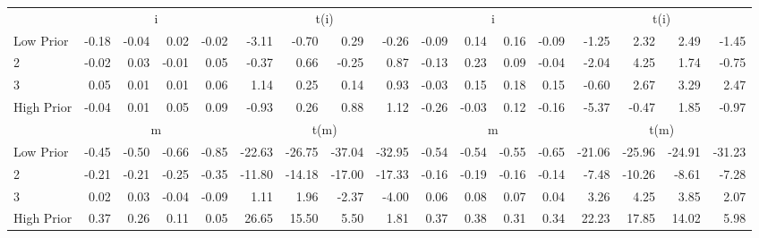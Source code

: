 \begin{table}[!ht]
\begin{tabular}{lrrrrrrrrrrrrrrrr}
  
     & \multicolumn{4}{c}{i} & \multicolumn{4}{c}{t(i)}  & \multicolumn{4}{c}{i} & \multicolumn{4}{c}{t(i)}   \\
     \cmidrule(r){2-5} \cmidrule(r){6-9}  \cmidrule(r){10-13} \cmidrule(r){14-17} 
    Low Prior  & -0.18  & -0.04  & 0.02  & -0.02  & -3.11  & -0.70  & 0.29  & -0.26  & -0.09  & 0.14  & 0.16  & -0.09  & -1.25  & 2.32  & 2.49  & -1.45   \\
    2  & -0.02  & 0.03  & -0.01  & 0.05  & -0.37  & 0.66  & -0.25  & 0.87  & -0.13  & 0.23  & 0.09  & -0.04  & -2.04  & 4.25  & 1.74  & -0.75   \\
    3  & 0.05  & 0.01  & 0.01  & 0.06  & 1.14  & 0.25  & 0.14  & 0.93  & -0.03  & 0.15  & 0.18  & 0.15  & -0.60  & 2.67  & 3.29  & 2.47   \\
    High Prior  & -0.04  & 0.01  & 0.05  & 0.09  & -0.93  & 0.26  & 0.88  & 1.12  & -0.26  & -0.03  & 0.12  & -0.16  & -5.37  & -0.47  & 1.85  & -0.97   \\
    
  
     & \multicolumn{4}{c}{m} & \multicolumn{4}{c}{t(m)}  & \multicolumn{4}{c}{m} & \multicolumn{4}{c}{t(m)}   \\
     \cmidrule(r){2-5} \cmidrule(r){6-9}  \cmidrule(r){10-13} \cmidrule(r){14-17} 
    Low Prior  & -0.45  & -0.50  & -0.66  & -0.85  & -22.63  & -26.75  & -37.04  & -32.95  & -0.54  & -0.54  & -0.55  & -0.65  & -21.06  & -25.96  & -24.91  & -31.23   \\
    2  & -0.21  & -0.21  & -0.25  & -0.35  & -11.80  & -14.18  & -17.00  & -17.33  & -0.16  & -0.19  & -0.16  & -0.14  & -7.48  & -10.26  & -8.61  & -7.28   \\
    3  & 0.02  & 0.03  & -0.04  & -0.09  & 1.11  & 1.96  & -2.37  & -4.00  & 0.06  & 0.08  & 0.07  & 0.04  & 3.26  & 4.25  & 3.85  & 2.07   \\
    High Prior  & 0.37  & 0.26  & 0.11  & 0.05  & 26.65  & 15.50  & 5.50  & 1.81  & 0.37  & 0.38  & 0.31  & 0.34  & 22.23  & 17.85  & 14.02  & 5.98   \\
    
  
  \bottomrule
\end{tabular}
\label{tbl:32_Size_BMm_Prior_F17}
\end{table}